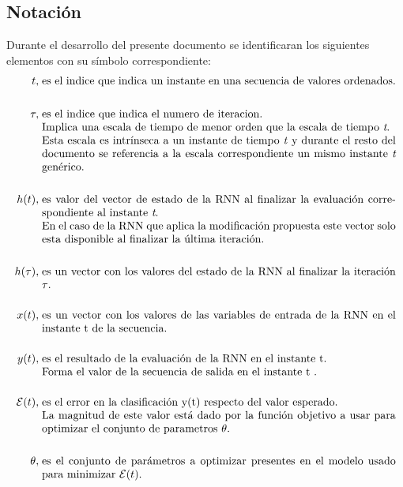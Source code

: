 \documentclass{article}
\begin{document}
	\subsection{Notación}
	Durante el desarrollo del presente documento se identificaran los siguientes elementos con su símbolo correspondiente:
	\begin{equation*}
	\begin{split}
	t, \; &\parbox[t]{32em}{ es el indice que indica un instante en una secuencia de valores ordenados.}\\
	\quad\\
	\tau, \; &\parbox[t]{32em}{ es el indice que indica el numero de iteracion. \\
		Implica una escala de tiempo de menor orden que la escala de tiempo \textit{t}.\\
		Esta escala es intrínseca a un instante de tiempo \textit{t} y durante el resto del documento se referencia a la escala correspondiente un mismo instante \textit{t} genérico.}\\
	\quad\\
	h(t), \; &\parbox[t]{32em}{ es valor del vector de estado de la RNN al finalizar la evaluación correspondiente al instante \textit{t}.\\
		En el caso de la RNN que aplica la modificación propuesta este vector solo esta disponible al finalizar la última iteración.}\\
	\quad\\
	h(\tau), \; &\parbox[t]{32em}{ es un vector con los valores del estado de la RNN al finalizar la iteración $\tau$.}\\
	\quad\\
	x(t), \; &\parbox[t]{32em}{ es un vector con los valores de las variables de entrada de la RNN en el instante t de la secuencia.}\\
	\quad\\
	y(t), \; &\parbox[t]{32em}{ es el resultado de la evaluación de la RNN en el instante t.\\
		Forma el valor de la secuencia de salida en el instante t .}\\
	\quad\\
	\mathcal{E}(t), \; &\parbox[t]{32em}{ es el error en la clasificación y(t) respecto del valor esperado.\\
		La magnitud de este valor está dado por la función objetivo a usar para optimizar el conjunto de parametros $\theta$.}\\
	\quad\\
	\theta, \; &\parbox[t]{32em}{ es el conjunto de parámetros a optimizar presentes en el modelo usado para minimizar $\mathcal{E}(t)$.}\\
	\quad\\
	\end{split}
	\end{equation*}
	
\end{document}
